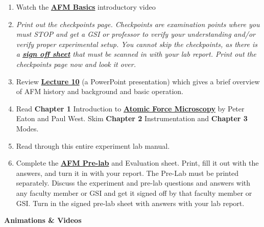 \documentclass{../lab}
\begin{document}
\begin{enumerate}
    \item Watch the \href{http://experimentationlab.berkeley.edu/sites/default/files/Introduction\%20Video\_2.mp4}{\textbf{AFM Basics}} introductory video

    \item \emph{Print out the checkpoints page. Checkpoints are examination points where you must STOP and get a GSI or professor to verify your understanding and/or verify proper experimental setup. You cannot skip the checkpoints, as there is a \href{http://experimentationlab.berkeley.edu/node/136}{\textbf{sign off sheet}} that must be scanned in with your lab report. Print out the checkpoints page now and look it over.}

    \item Review \href{http://experimentationlab.berkeley.edu/sites/default/files/AFMImages/Lecture\_10\_AFM.pdf}{\textbf{Lecture 10}} (a PowerPoint presentation) which gives a brief overview of AFM history and background and basic operation.

    \item Read \textbf{Chapter 1} Introduction to \href{http://experimentationlab.berkeley.edu/afm-book}{\textbf{Atomic Force Microscopy}} by Peter Eaton and Paul West. Skim \textbf{Chapter 2} Instrumentation and \textbf{Chapter 3} Modes.

    \item Read through this entire experiment lab manual.

    \item Complete the \href{http://experimentationlab.berkeley.edu/node/122}{\textbf{AFM Pre-lab}} and Evaluation sheet. Print, fill it out with the answers, and turn it in with your report. The Pre-Lab must be printed separately. Discuss the experiment and pre-lab questions and answers with any faculty member or GSI and get it signed off by that faculty member or GSI. Turn in the signed pre-lab sheet with answers with your lab report.

\end{enumerate}

\textbf{Animations \& Videos}
\end{document}
